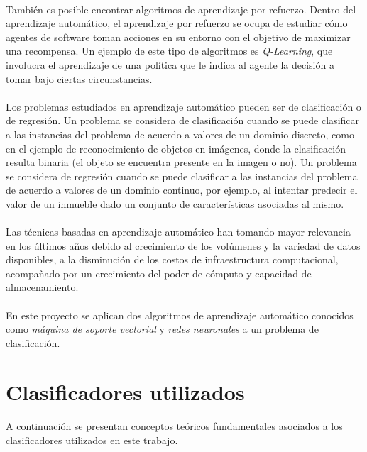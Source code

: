 \paragraph{}También es posible encontrar algoritmos de aprendizaje por refuerzo.
Dentro del aprendizaje automático, el aprendizaje por refuerzo se ocupa de estudiar cómo agentes de software toman acciones en su entorno con el objetivo de maximizar una recompensa.
Un ejemplo de este tipo de algoritmos es \textit{Q-Learning}, que involucra el aprendizaje de una política que le indica al agente la decisión a tomar bajo ciertas circunstancias.

\paragraph{}Los problemas estudiados en aprendizaje automático pueden ser de clasificación o de regresión.
Un problema se considera de clasificación cuando se puede clasificar a las instancias del problema de acuerdo a valores de un dominio discreto, como en el ejemplo de reconocimiento de objetos en imágenes, donde la clasificación resulta binaria (el objeto se encuentra presente en la imagen o no).
Un problema se considera de regresión cuando se puede clasificar a las instancias del problema de acuerdo a valores de un dominio continuo, por ejemplo, al intentar predecir el valor de un inmueble dado un conjunto de características asociadas al mismo.

\paragraph{}Las técnicas basadas en aprendizaje automático han tomando mayor relevancia en los últimos años debido al crecimiento de los volúmenes y la variedad de datos disponibles, a la disminución de los costos de infraestructura computacional, acompañado por un crecimiento del poder de cómputo y capacidad de almacenamiento.

\paragraph{}En este proyecto se aplican dos algoritmos de aprendizaje automático conocidos como \textit{máquina de soporte vectorial} y \textit{redes neuronales} a un problema de clasificación.

\section{Clasificadores utilizados}

\paragraph{}A continuación se presentan conceptos teóricos fundamentales asociados a los clasificadores utilizados en este trabajo.





